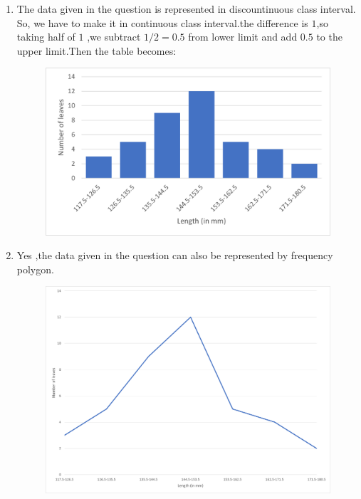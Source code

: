 \documentclass[12pt,twocolumn]{IEEEtran}
\begin{document}
\begin{enumerate}[label=(\roman*)]
	\item The data given in the question is represented in discountinuous class interval. So, we have to make it in continuous class interval.the difference is $1$,so taking half of $1$ ,we subtract $1/2=0.5$ from lower limit and add $0.5$ to the upper limit.Then the table becomes:
	      \begin{table}[ht!]
		      \begin{center}
			      
			      \vspace*{3pt}
			      \caption{}
			      \label{table:table2}
		      \end{center}
	      \end{table}
	      \begin{figure}[ht!]
		      \begin{center}
			      \includegraphics[width=\columnwidth]{fig/Picture1.png}
			      \caption{}
			      \label{fig:fig1}
		      \end{center}

	      \end{figure}
		  \pagebreak
	\item Yes ,the data given in the question can also be represented by frequency polygon.
	\begin{figure}[ht!]
		\begin{center}
			\includegraphics[width=\columnwidth]{fig/Picture2.png}
			\caption{}
			\label{fig:fig2}
		\end{center}


\end{figure}
\end{enumerate}
\end{document}
